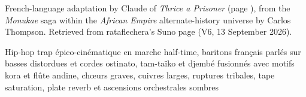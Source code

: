 
\begin{notes}
French-language adaptation by Claude of \emph{Thrice a Prisoner} (page \pageref{sec:thrice-a-prisoner}), from the \emph{Monukae} saga within the \emph{African Empire} alternate-history universe by Carlos Thompson. Retrieved from rataflechera's Suno page (V6, 13 September 2026).
\end{notes}
\begin{style}
Hip-hop trap épico-cinématique en marche half-time, baritons français parlés sur basses distordues et cordes ostinato, tam-taïko et djembé fusionnés avec motifs kora et flûte andine, chœurs graves, cuivres larges, ruptures tribales, tape saturation, plate reverb et ascensions orchestrales sombres
\end{style}
